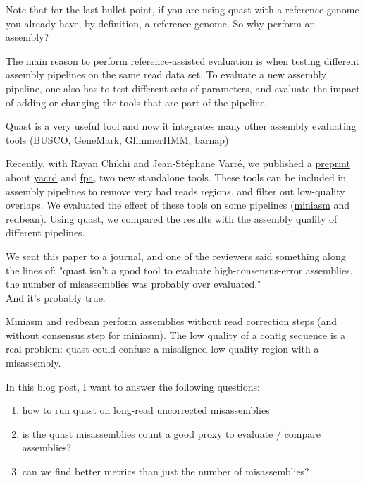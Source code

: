 \documentclass[./main.tex]{subfiles}
\begin{document}
Note that for the last bullet point, if you are using quast with a
reference genome you already have, by definition, a reference genome. So
why perform an assembly?

The main reason to perform reference-assisted evaluation is when testing
different assembly pipelines on the same read data set. To evaluate a
new assembly pipeline, one also has to test different sets of
parameters, and evaluate the impact of adding or changing the tools that
are part of the pipeline.

Quast is a very useful tool and now it integrates many other assembly
evaluating tools (BUSCO,
\href{http://exon.gatech.edu/GeneMark/}{GeneMark},
\href{https://doi.org/10.1093/bioinformatics/bth315}{GlimmerHMM},
\href{https://github.com/tseemann/barrnap}{barnap})

Recently, with Rayan Chikhi and Jean-Stéphane Varré, we published a
\href{https://www.biorxiv.org/content/10.1101/674036v2}{preprint} about
\href{https://github.com/natir/yacrd/}{yacrd} and
\href{https://github.com/natir/fpa}{fpa}, two new standalone tools.
These tools can be included in assembly pipelines to remove very bad
reads regions, and filter out low-quality overlaps. We evaluated the
effect of these tools on some pipelines
(\href{https://github.com/lh3/miniasm}{miniasm} and
\href{https://github.com/ruanjue/wtdbg2}{redbean}). Using quast, we
compared the results with the assembly quality of different pipelines.

We sent this paper to a journal, and one of the reviewers said something
along the lines of: "quast isn't a good tool to evaluate
high-consensus-error assemblies, the number of misassemblies was
probably over evaluated."\\
And it's probably true.

Miniasm and redbean perform assemblies without read correction steps
(and without consensus step for miniasm). The low quality of a contig
sequence is a real problem: quast could confuse a misaligned low-quality
region with a misassembly.

In this blog post, I want to answer the following questions:

\begin{enumerate}
\def\labelenumi{\arabic{enumi}.}
\item how to run quast on long-read uncorrected misassemblies
\item is the quast misassemblies count a good proxy to evaluate / compare assemblies?
\item can we find better metrics than just the number of misassemblies?
\end{enumerate}
\end{document}
